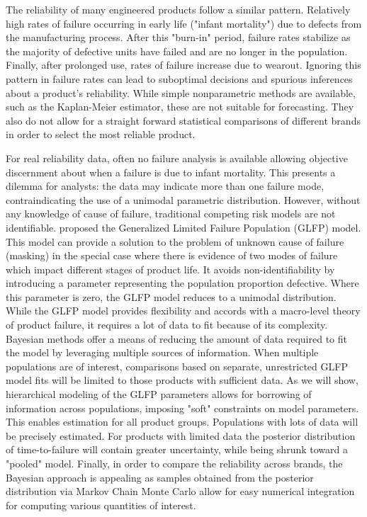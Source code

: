\documentclass[12pt]{article}
\begin{document}
The reliability of many engineered products follow a similar pattern. Relatively high rates of failure occurring in early life ("infant mortality") due to defects from the manufacturing process. After this "burn-in" period, failure rates stabilize as the majority of defective units have failed and are no longer in the population.  Finally, after prolonged use, rates of failure increase due to wearout.  Ignoring this pattern in failure rates can lead to suboptimal decisions and spurious inferences about a product's reliability.   While simple nonparametric methods are available, such as the Kaplan-Meier estimator, these are not suitable for forecasting.  They also do not allow for a straight forward statistical comparisons of different brands in order to select the most reliable product. 

For real reliability data, often no failure analysis is available allowing objective discernment about when a failure is due to infant mortality. This presents a dilemma for analysts: the data may indicate more than one failure mode, contraindicating the use of a unimodal parametric distribution. However, without any knowledge of cause of failure, traditional competing risk models are not identifiable. \citet{chan} proposed the Generalized Limited Failure Population (GLFP) model. This model can provide a solution to the problem of unknown cause of failure (masking) in the special case where there is evidence of two modes of failure which impact different stages of product life. It avoids non-identifiability by introducing a parameter representing the population proportion defective. Where this parameter is zero, the GLFP model reduces to a unimodal distribution. \\

While the GLFP model provides flexibility and accords with a macro-level theory of product failure, it requires a lot of data to fit because of its complexity. Bayesian methods offer a means of reducing the amount of data required to fit the model by leveraging multiple sources of information. When multiple populations are of interest, comparisons based on separate, unrestricted GLFP model fits will be limited to those products with sufficient data. As we will show, hierarchical modeling of the GLFP parameters allows for borrowing of information across populations, imposing "soft" constraints on model parameters. This enables estimation for all product groups.  Populations with lots of data will be precisely estimated.  For products with limited data the posterior distribution of time-to-failure will contain greater uncertainty, while being shrunk toward a "pooled" model. Finally, in order to compare the reliability across brands, the Bayesian approach is appealing as samples obtained from the posterior distribution via Markov Chain Monte Carlo allow for easy numerical integration for computing  various quantities of interest. \\
\end{document}
